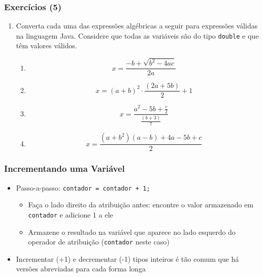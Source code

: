 \documentclass[xcolor={dvipsnames,table},aspectratio=169]{beamer}
\newcommand\setItemnumber[1]{\setcounter{enumi}{\numexpr#1-1\relax}}
\begin{document}
\begin{frame}[fragile]\frametitle{Exercícios (5)}
\begin{enumerate}
	\setItemnumber{6}
	\item Converta cada uma das expressões algébricas a seguir para expressões válidas na linguagem Java. Considere que todas as variáveis são do tipo \texttt{double} e que têm valores válidos.
	\begin{enumerate}[a]
		\item \[ x = \frac{-b+\sqrt{b^2-4ac}}{2a} \]
		\item \[ x = (a+b)^2 \cdot \frac{(2a+5b)}{2} + 1 \]
		\item \[ x = \frac{a^2 -5b + \frac{c}{2} }{ \frac{(b+3)}{7} } \]
		\item \[ x = \frac{(a+b^2)(a-b)+4a-5b+c}{2} \]
	\end{enumerate}
\end{enumerate}
\end{frame}

\begin{frame}\frametitle{Incrementando uma Variável}
\begin{itemize}
	\item Passo-a-passo: \texttt{contador = contador + 1;}
	\begin{itemize}
		\item Faça o lado direito da atribuição antes: encontre o valor armazenado em \texttt{contador} e adicione 1 a ele
		\item Armazene o resultado na variável que aparece no lado esquerdo do operador de atribuição (\texttt{contador} neste caso)
	\end{itemize}
	\item Incrementar (+1) e decrementar (-1) tipos inteiros é tão comum que há versões abreviadas para cada forma longa
\end{itemize}

\begin{center}
\end{center}
\end{frame}
\end{document}
